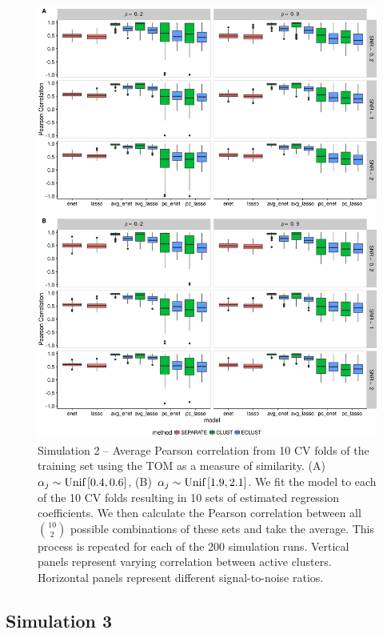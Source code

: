 \begin{figure}[H]
	\centering
	\includegraphics[scale=0.55, keepaspectratio]{./figs/hydra/results/figures/sim2-sept8/pearson_TOM_sim2.png}
	\caption{Simulation 2 -- Average Pearson correlation from 10 CV folds of the training set using the TOM as a measure of similarity. \mbox{(A) $\alpha_{j} \sim \textrm{{Unif}}\left[0.4, 0.6\right]$}, \mbox{(B) $\alpha_{j} \sim \textrm{{Unif}}\left[1.9, 2.1\right]$}. We fit the model to each of the 10 CV folds resulting in 10 sets of estimated regression coefficients. We then calculate the Pearson correlation between all $\binom{10}{2}$ possible combinations of these sets and take the average. This process is repeated for each of the 200 simulation runs. Vertical panels represent varying correlation between active clusters. Horizontal panels represent different signal-to-noise ratios.}
	\label{fig:pearson_TOM_sim2}
\end{figure}




\subsection*{Simulation 3}

